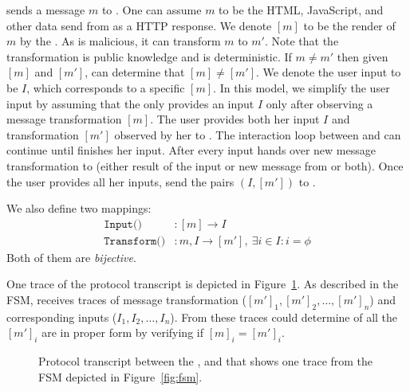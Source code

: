 \server sends a message $m$ to \host. One can assume $m$ to be the HTML, JavaScript, and other data send from \server as a HTTP response. We denote $[m]$ to be the render of $m$ by the \host. As \host is malicious, it can transform $m$ to $m'$. Note that the transformation is public knowledge and is deterministic. If $m\neq m'$ then given $[m]$ and $[m']$, \server can determine that $[m]\neq [m']$. We denote the user input to be $I$, which corresponds to a specific $[m]$. 
In this model, we simplify the user input by assuming that the \user only provides an input $I$ only after observing a message transformation $[m]$. The user provides both her input $I$ and transformation $[m']$ observed by her to \host. The interaction loop between \host and \user can continue until \user finishes her input. After every input \host hands over new message transformation to \user (either result of the input or new message from \server or both). Once the user provides all her inputs, \host send the pairs $(I, [m'])$ to \server.

We also define two mappings:
\begin{align*}
\texttt{Input()}&:[m]\rightarrow I \\
\texttt{Transform()}&:m,I\rightarrow [m'],\ \exists i\in I:i=\phi
\end{align*}
Both of them are \emph{bijective}.

One trace of the protocol transcript is depicted in Figure~\ref{fig:protocol}. As described in the FSM, \server receives traces of message transformation ($[m']_1,[m']_2,\ldots,[m']_n$) and corresponding inputs ($I_1,I_2,\ldots,I_n$). From these traces \server could determine of all the $[m']_i$ are in proper form by verifying if $[m]_i=[m']_i$.

\begin{figure}[t]
\begin{center}
\begin{sequencediagram}
\end{sequencediagram}
\end{center}
\caption{Protocol transcript between the \server, \user and \host that shows one trace from the FSM depicted in Figure~\ref{fig:fsm}.}
\label{fig:protocol}
\end{figure}



